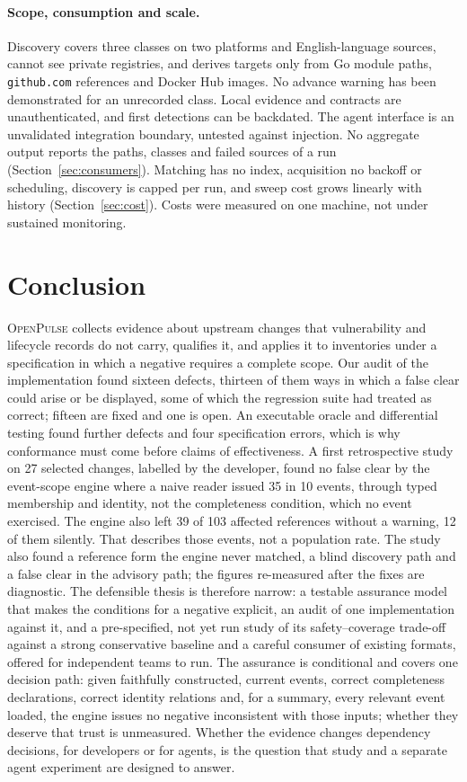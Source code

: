 \documentclass[11pt,a4paper]{article}
\newcommand{\op}{\textsc{OpenPulse}}
\newcommand{\code}[1]{\texttt{#1}}
\begin{document}
\paragraph{Scope, consumption and scale.} Discovery covers three
classes on two platforms and English-language sources, cannot see
private registries, and derives targets only from Go module paths,
\code{github.com} references and Docker Hub images. No advance warning
has been demonstrated for an unrecorded class. Local evidence and
contracts are unauthenticated, and first detections can be backdated.
The agent interface is an unvalidated integration boundary, untested
against injection. No aggregate output reports the paths, classes and
failed sources of a run (Section~\ref{sec:consumers}). Matching has no
index, acquisition no backoff or scheduling, discovery is capped per
run, and sweep cost grows linearly with history
(Section~\ref{sec:cost}). Costs were measured on one machine, not under
sustained monitoring.

\section{Conclusion}
\label{sec:conclusion}
\op{} collects evidence about upstream changes that vulnerability and
lifecycle records do not carry, qualifies it, and applies it to
inventories under a specification in which a negative requires a
complete scope. Our audit
of the implementation found sixteen defects, thirteen of them ways in
which a false clear could arise or be displayed, some of which the
regression suite had treated as correct; fifteen are fixed and one is
open. An executable oracle and differential testing found further
defects and four specification errors, which is why conformance must
come before claims of effectiveness.
A first retrospective study on 27 selected changes, labelled by the
developer, found no false clear by the event-scope engine where a
naive reader issued 35 in 10 events, through typed membership and
identity, not the completeness condition, which no event exercised.
The engine also left 39 of 103 affected references without a warning,
12 of them silently. That describes those events, not a population
rate. The study also found a reference form the engine never matched,
a blind discovery path and a false clear in the advisory path; the
figures re-measured after the fixes are diagnostic.
The defensible thesis is therefore narrow: a testable assurance model
that makes the conditions for a negative explicit, an audit of one
implementation against it, and a pre-specified, not yet run study of
its safety--coverage trade-off against a strong conservative baseline
and a careful consumer of existing formats, offered for independent
teams to run. The assurance is conditional and covers one decision
path: given faithfully constructed, current events, correct
completeness declarations, correct identity relations and, for a
summary, every relevant event loaded, the engine issues no negative
inconsistent with those inputs; whether they deserve that trust is
unmeasured. Whether the evidence changes dependency decisions, for
developers or for agents, is the question that study and a separate
agent experiment are designed to answer.
\end{document}
